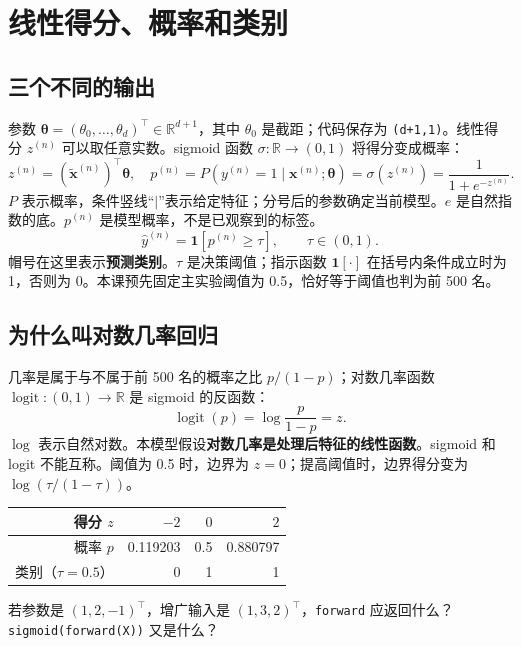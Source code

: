 \documentclass[UTF8,a4paper,11pt,fontset=fandol]{ctexart}
\begin{document}
\section{线性得分、概率和类别}
\subsection{三个不同的输出}
参数 $\boldsymbol\theta=(\theta_0,\ldots,\theta_d)^\top\in\mathbb R^{d+1}$，其中 $\theta_0$ 是截距；代码保存为 \texttt{(d+1,1)}。线性得分 $z^{(n)}$ 可以取任意实数。sigmoid 函数 $\sigma:\mathbb R\to(0,1)$ 将得分变成概率：
\begin{equation}
z^{(n)}=(\tilde{\mathbf x}^{(n)})^\top\boldsymbol\theta,\quad
p^{(n)}=P(y^{(n)}=1\mid\mathbf x^{(n)};\boldsymbol\theta)=\sigma(z^{(n)})=\frac1{1+e^{-z^{(n)}}}.
\end{equation}
$P$ 表示概率，条件竖线“$\mid$”表示给定特征；分号后的参数确定当前模型。$e$ 是自然指数的底。$p^{(n)}$ 是模型概率，不是已观察到的标签。
\begin{equation}
\hat y^{(n)}=\mathbf1[p^{(n)}\ge\tau],\qquad \tau\in(0,1).
\end{equation}
帽号在这里表示\textbf{预测类别}。$\tau$ 是决策阈值；指示函数 $\mathbf1[\cdot]$ 在括号内条件成立时为 1，否则为 0。本课预先固定主实验阈值为 0.5，恰好等于阈值也判为前 500 名。
\subsection{为什么叫对数几率回归}
几率是属于与不属于前 500 名的概率之比 $p/(1-p)$；对数几率函数 $\operatorname{logit}:(0,1)\to\mathbb R$ 是 sigmoid 的反函数：
\begin{equation}
\operatorname{logit}(p)=\log\frac{p}{1-p}=z.
\end{equation}
$\log$ 表示自然对数。本模型假设\textbf{对数几率是处理后特征的线性函数}。sigmoid 和 logit 不能互称。阈值为 0.5 时，边界为 $z=0$；提高阈值时，边界得分变为 $\log(\tau/(1-\tau))$。
\begin{center}\begin{tabular}{rrrr}\toprule
得分 $z$ & $-2$ & $0$ & $2$\\\midrule
概率 $p$ & 0.119203 & 0.5 & 0.880797\\
类别（$\tau=0.5$） & 0 & 1 & 1\\\bottomrule
\end{tabular}\end{center}
\begin{questionbox}
若参数是 $(1,2,-1)^\top$，增广输入是 $(1,3,2)^\top$，\texttt{forward} 应返回什么？\texttt{sigmoid(forward(X))} 又是什么？
\end{questionbox}
\clearpage
\end{document}
